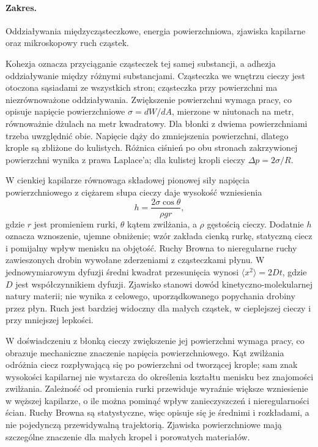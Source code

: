 \documentclass[11pt,a4paper]{article}
\begin{document}
\paragraph{Zakres.} Oddziaływania międzycząsteczkowe, energia powierzchniowa, zjawiska kapilarne oraz mikroskopowy ruch cząstek.

Kohezja oznacza przyciąganie cząsteczek tej samej substancji, a adhezja oddziaływanie między różnymi substancjami. Cząsteczka we wnętrzu cieczy jest otoczona sąsiadami ze wszystkich stron; cząsteczka przy powierzchni ma niezrównoważone oddziaływania. Zwiększenie powierzchni wymaga pracy, co opisuje napięcie powierzchniowe $\sigma=dW/dA$, mierzone w niutonach na metr, równoważnie dżulach na metr kwadratowy. Dla błonki z dwiema powierzchniami trzeba uwzględnić obie. Napięcie dąży do zmniejszenia powierzchni, dlatego krople są zbliżone do kulistych. Różnica ciśnień po obu stronach zakrzywionej powierzchni wynika z prawa Laplace’a; dla kulistej kropli cieczy $\Delta p=2\sigma/R$.

W cienkiej kapilarze równowaga składowej pionowej siły napięcia powierzchniowego z ciężarem słupa cieczy daje wysokość wzniesienia
\[
h=\frac{2\sigma\cos\theta}{\rho gr},
\]
gdzie $r$ jest promieniem rurki, $\theta$ kątem zwilżania, a $\rho$ gęstością cieczy. Dodatnie $h$ oznacza wznoszenie, ujemne obniżenie; wzór zakłada cienką rurkę, statyczną ciecz i pomijalny wpływ menisku na objętość. Ruchy Browna to nieregularne ruchy zawieszonych drobin wywołane zderzeniami z cząsteczkami płynu. W jednowymiarowym dyfuzji średni kwadrat przesunięcia wynosi $\langle x^2\rangle=2Dt$, gdzie $D$ jest współczynnikiem dyfuzji. Zjawisko stanowi dowód kinetyczno-molekularnej natury materii; nie wynika z celowego, uporządkowanego popychania drobiny przez płyn. Ruch jest bardziej widoczny dla małych cząstek, w cieplejszej cieczy i przy mniejszej lepkości.

W doświadczeniu z błonką cieczy zwiększenie jej powierzchni wymaga pracy, co obrazuje mechaniczne znaczenie napięcia powierzchniowego. Kąt zwilżania odróżnia ciecz rozpływającą się po powierzchni od tworzącej krople; sam znak wysokości kapilarnej nie wystarcza do określenia kształtu menisku bez znajomości zwilżania. Zależność od promienia rurki przewiduje wyraźnie większe wzniesienie w węższej kapilarze, o ile można pominąć wpływ zanieczyszczeń i nieregularności ścian. Ruchy Browna są statystyczne, więc opisuje się je średnimi i rozkładami, a nie pojedynczą przewidywalną trajektorią. Zjawiska powierzchniowe mają szczególne znaczenie dla małych kropel i porowatych materiałów.
\end{document}
